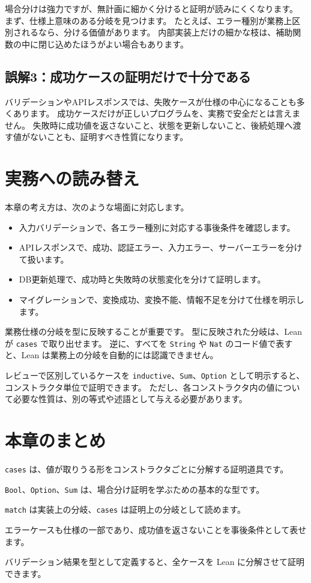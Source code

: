 場合分けは強力ですが、無計画に細かく分けると証明が読みにくくなります。
まず、仕様上意味のある分岐を見つけます。
たとえば、エラー種別が業務上区別されるなら、分ける価値があります。
内部実装上だけの細かな枝は、補助関数の中に閉じ込めたほうがよい場合もあります。

\subsection{誤解3：成功ケースの証明だけで十分である}

バリデーションやAPIレスポンスでは、失敗ケースが仕様の中心になることも多くあります。
成功ケースだけが正しいプログラムを、実務で安全だとは言えません。
失敗時に成功値を返さないこと、状態を更新しないこと、後続処理へ渡す値がないことも、証明すべき性質になります。

\section{実務への読み替え}

本章の考え方は、次のような場面に対応します。

\begin{itemize}
\item 入力バリデーションで、各エラー種別に対応する事後条件を確認します。
\item APIレスポンスで、成功、認証エラー、入力エラー、サーバーエラーを分けて扱います。
\item DB更新処理で、成功時と失敗時の状態変化を分けて証明します。
\item マイグレーションで、変換成功、変換不能、情報不足を分けて仕様を明示します。
\end{itemize}

業務仕様の分岐を型に反映することが重要です。
型に反映された分岐は、Lean が \texttt{cases} で取り出せます。
逆に、すべてを \texttt{String} や \texttt{Nat} のコード値で表すと、Lean は業務上の分岐を自動的には認識できません。

レビューで区別しているケースを \texttt{inductive}、\texttt{Sum}、\texttt{Option} として明示すると、コンストラクタ単位で証明できます。
ただし、各コンストラクタ内の値について必要な性質は、別の等式や述語として与える必要があります。

\section{本章のまとめ}

\texttt{cases} は、値が取りうる形をコンストラクタごとに分解する証明道具です。

\texttt{Bool}、\texttt{Option}、\texttt{Sum} は、場合分け証明を学ぶための基本的な型です。

\texttt{match} は実装上の分岐、\texttt{cases} は証明上の分岐として読めます。

エラーケースも仕様の一部であり、成功値を返さないことを事後条件として表せます。

バリデーション結果を型として定義すると、全ケースを Lean に分解させて証明できます。
